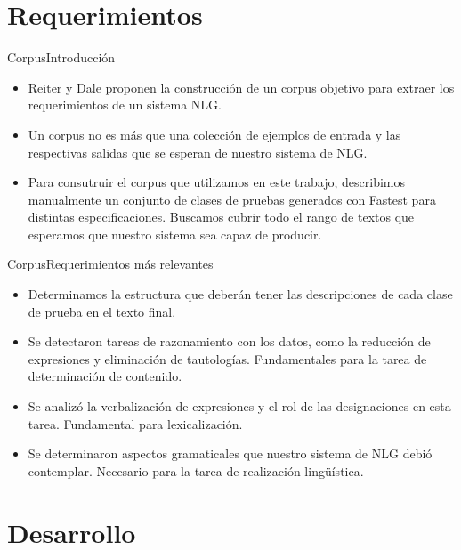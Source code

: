 \documentclass{beamer}
\begin{document}
      \section{Requerimientos}
      \begin{frame}{Corpus}{Introducción}
        \begin{itemize}
          \item Reiter y Dale proponen la construcción de un corpus objetivo para extraer los requerimientos de un sistema NLG.
          \item Un corpus no es más que una colección de ejemplos de entrada y las respectivas salidas que se esperan de nuestro sistema de NLG. 
          \item Para consutruir el corpus que utilizamos en este trabajo, describimos manualmente un conjunto de clases de pruebas generados con Fastest para distintas especificaciones. Buscamos cubrir todo el rango de textos que esperamos que nuestro sistema sea capaz de producir.
        \end{itemize}
      \end{frame}
                  										
      \begin{frame}{Corpus}{Requerimientos más relevantes}
        \begin{itemize}
          \item Determinamos la estructura que deberán tener las descripciones de cada clase de prueba en el texto final.
          \item Se detectaron tareas de razonamiento con los datos, como la reducción de expresiones y eliminación de tautologías. Fundamentales para la tarea de determinación de contenido.
          \item Se analizó la verbalización de expresiones y el rol de las designaciones en esta tarea. Fundamental para lexicalización.
          \item Se determinaron aspectos gramaticales que nuestro sistema de NLG debió contemplar. Necesario para la tarea de realización lingüística.
        \end{itemize}
      \end{frame}
                  										
      \section{Desarrollo}
                  										
\end{document}

